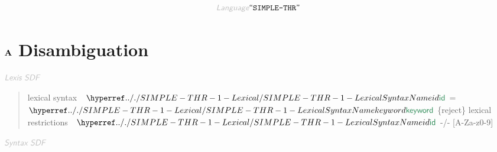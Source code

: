 \begin{displaymath}
\KEY{Language} \STRING{SIMPLE-THR}
\end{displaymath}

\section*{$\SECT{A}$ Disambiguation}\hypertarget{secta-disambiguation}{}\label{secta-disambiguation}

$\KEY{Lexis SDF}$

\begin{quote}
lexical syntax\newline
  $\SHADE{~~\SYNHYPER{../.}{SIMPLE-THR-1-Lexical}{id}}$ = $\SHADE{\SYNHYPER{../.}{SIMPLE-THR-1-Lexical}{keyword}}$ \{reject\}\newline
\newline
lexical restrictions\newline
  $\SHADE{~~\SYNHYPER{../.}{SIMPLE-THR-1-Lexical}{id}}$ -/- {[}A-Za-z0-9{]}
\end{quote}

$\KEY{Syntax SDF}$

